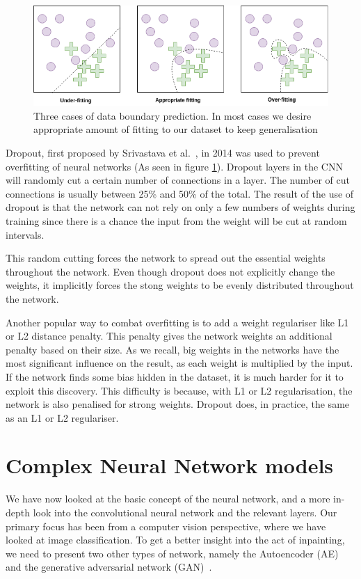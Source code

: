 \begin{figure}[t]
        \centering
        \includegraphics[scale=0.6]{background/figures/Under_vs_overfitting.png}
        \caption{Three cases of data boundary prediction. In most cases we desire appropriate amount of fitting to our dataset to keep generalisation}
        \label{fig:dropout}
\end{figure}


Dropout, first proposed by Srivastava et al.~\cite{JMLR:v15:srivastava14a}, in 2014 was used to prevent overfitting of neural networks (As seen in figure \ref{fig:dropout}).
Dropout layers in the CNN will randomly cut a certain number of connections in a layer. The number of cut connections is usually between 25\% and 50\% of the total. The result of the use of dropout is that the network can not rely on only a few numbers of weights during training since there is a chance the input from the weight will be cut at random intervals. 

This random cutting forces the network to spread out the essential weights throughout the network. 
Even though dropout does not explicitly change the weights, it implicitly forces the stong weights to be evenly distributed throughout the network. 

Another popular way to combat overfitting is to add a weight regulariser like L1 or L2 distance penalty. This penalty gives the network weights an additional penalty based on their size.
As we recall, big weights in the networks have the most significant influence on the result, as each weight is multiplied by the input. If the network finds some bias hidden in the dataset, it is much harder for it to exploit this discovery.
This difficulty is because, with L1 or L2 regularisation, the network is also penalised for strong weights.
Dropout does, in practice, the same as an L1 or L2 regulariser. 


\section{Complex Neural Network models}
We have now looked at the basic concept of the neural network, and a more in-depth look into the convolutional neural network and the relevant layers.
Our primary focus has been from a computer vision perspective, where we have looked at image classification. 
To get a better insight into the act of inpainting, we need to present two other types of network, namely the Autoencoder (AE)~\cite{Rumelhart:1986:LIR:104279.104293} and the generative adversarial network (GAN)~\cite{Goodfellow:2014:GAN:2969033.2969125}.

